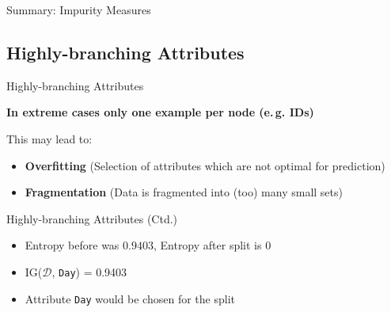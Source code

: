 \begin{frame}{Summary: Impurity Measures}{}
	
\end{frame}


\subsection{Highly-branching Attributes}

\begin{frame}{Highly-branching Attributes}{}
	\begin{boxBlueNoFrame}

		\vspace*{4mm}
		\textbf{In extreme cases only one example per node (e.\,g. IDs)}
	\end{boxBlueNoFrame}

	\begin{boxBlueNoFrame}
		This may lead to:
		\begin{itemize}
			\item \textbf{Overfitting} \footnotesize (Selection of attributes which are not optimal for prediction) \normalsize
			\item \textbf{Fragmentation} \footnotesize (Data is fragmented into (too) many small sets) \normalsize
		\end{itemize}
	\end{boxBlueNoFrame}
\end{frame}


\begin{frame}{Highly-branching Attributes (Ctd.)}{}
	\vspace*{-2mm}
	
	\vspace*{-5mm}
	\begin{itemize}
		\item Entropy before was $0.9403$, Entropy after split is $0$
		\item IG($\mathcal{D}$, \texttt{Day}) = 0.9403
		\item Attribute \texttt{Day} would be chosen for the split 
	\end{itemize}
\end{frame}


